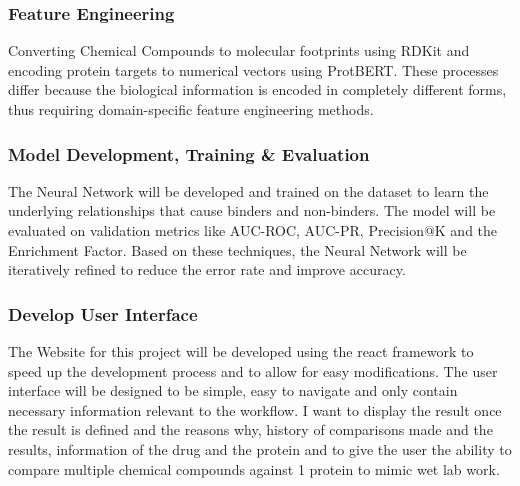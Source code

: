 \subsubsection{Feature Engineering}
Converting Chemical Compounds to molecular footprints using RDKit and encoding protein targets to numerical vectors using ProtBERT. These processes differ because the biological information is encoded in completely different forms, thus requiring domain-specific feature engineering methods.
\subsubsection{Model Development, Training \& Evaluation}
The Neural Network will be developed and trained on the dataset to learn the underlying relationships that cause binders and non-binders. The model will be evaluated on validation metrics like AUC-ROC, AUC-PR, Precision@K and the Enrichment Factor. Based on these techniques, the Neural Network will be iteratively refined to reduce the error rate and improve accuracy. 
\subsubsection{Develop User Interface}
The Website for this project will be developed using the react framework to speed up the development process and to allow for easy modifications.
The user interface will be designed to be simple, easy to navigate and only contain necessary information relevant to the workflow. 
I want to display the result once the result is defined and the reasons why, history of comparisons made and the results, information of the drug and the protein and to give the user the ability to compare multiple chemical compounds against 1 protein to mimic wet lab work.
